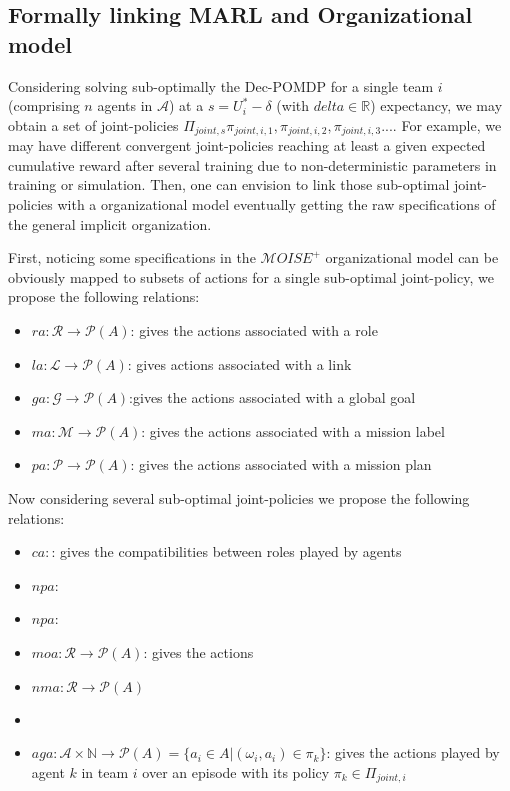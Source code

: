 \documentclass[runningheads]{llncs}
\begin{document}
\subsection{Formally linking MARL and Organizational model}

Considering solving sub-optimally the Dec-POMDP for a single team $i$ (comprising $n$ agents in $\mathcal{A}$) at a $s = U_i^* - \delta$ (with $delta \in \mathbb{R}$) expectancy, we may obtain a set of joint-policies $\Pi_{joint,s}{\pi_{joint,i,1}, \pi_{joint,i,2}, \pi_{joint,i,3}...}$. For example, we may have different convergent joint-policies reaching at least a given expected cumulative reward after several training due to non-deterministic parameters in training or simulation. Then, one can envision to link those sub-optimal joint-policies with a organizational model eventually getting the raw specifications of the general implicit organization.

First, noticing some specifications in the $\mathcal{M}OISE^+$ organizational model can be obviously mapped to subsets of actions for a single sub-optimal joint-policy, we propose the following relations:

\begin{itemize}
    \item $ra: \mathcal{R} \rightarrow \mathcal{P}(A)$: gives the actions associated with a role
    \item $la: \mathcal{L} \rightarrow \mathcal{P}(A)$: gives actions associated with a link
    \item $ga: \mathcal{G} \rightarrow \mathcal{P}(A)$:gives the actions associated with a global goal
    \item $ma: \mathcal{M} \rightarrow \mathcal{P}(A)$: gives the actions associated with a mission label
    \item $pa: \mathcal{P} \rightarrow \mathcal{P}(A)$: gives the actions associated with a mission plan
\end{itemize}

Now considering several sub-optimal joint-policies we propose the following relations:

\begin{itemize}
    \item $ca: $: gives the compatibilities between roles played by agents
    \item $npa$:
    \item $npa$:
    \item $moa: \mathcal{R} \rightarrow \mathcal{P}(A)$: gives the actions
    \item $nma: \mathcal{R} \rightarrow \mathcal{P}(A)$
    \item 

    \item $aga: \mathcal{A} \times \mathbb{N} \rightarrow \mathcal{P}(A) = \{a_i \in A | (\omega_i, a_i) \in \pi_k\}$: gives the actions played by agent $k$ in team $i$ over an episode with its policy $\pi_k \in \Pi_{joint, i}$
\end{itemize}
\end{document}
